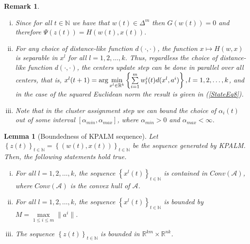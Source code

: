 \documentclass[11pt]{article}
\numberwithin{equation}{section}
\newtheorem{lemma}{Lemma}[proposition]
\newtheorem{remark}{Remark}
\begin{document}
\begin{remark} 
	\begin{enumerate}[(i)] \label{StateEq15}
		\item Since for all $t \in \mathbb{N}$ we have that $w(t) \in \Delta^m$ then $G(w(t))=0$ and therefore $\Psi(z(t)) = H(w(t),x(t))$. \label{StateEq16}
		\item For any choice of distance-like function $d(\cdot, \cdot)$, the function $x \mapsto H(w,x)$ is separable in $x^l$ for all $l = 1, 2, \ldots, k$. Thus, regardless the choice of distance-like function $d(\cdot, \cdot)$, the centers update step can be done in parallel over all centers, that is, $x^l(t+1) = \arg\min\limits_{x^l \in \mathbb{R}^k} \left\lbrace \sum\limits_{i=1}^{m} w^i_l(t) d(x^l , a^i) \right\rbrace, \\ l = 1, 2, \ldots, k$, and in the case of the squared Euclidean norm the result is given in (\ref{StateEq8}).
		\item Note that in the cluster assignment step we can bound the choice of $\alpha_i(t)$  out of some interval $\left[ \alpha_{min} , \alpha_{max} \right]$, where $\alpha_{min} > 0$ and $\alpha_{max} < \infty$. \label{StateItem3}
	\end{enumerate}
\end{remark}

\begin{lemma}[Boundedness of KPALM sequence]
Let $\left\lbrace z(t) \right\rbrace_{t \in \mathbb{N}} = \left\lbrace (w(t) , x(t)) \right\rbrace_{t \in \mathbb{N}}$ be the sequence generated by KPALM. Then, the following statements hold true.
\begin{enumerate}[(i)]
	\item For all $l=1, 2, \ldots ,k$, the sequence $\left\lbrace x^l(t) \right\rbrace_{t \in \mathbb{N}}$ is contained in $Conv(\mathcal{A})$, where $Conv(\mathcal{A})$ is the convex hull of $\mathcal{A}$.
	\item For all $l=1, 2, \ldots ,k$, the sequence $\left\lbrace x^l(t) \right\rbrace_{t \in \mathbb{N}}$ is bounded by $M = \max\limits_{1 \leq i \leq m} \| a^i \|$.
	\item The sequence $\left\lbrace z(t) \right\rbrace_{t \in \mathbb{N}}$ is bounded in $\mathbb{R}^{km} \times \mathbb{R}^{nk}$.
\end{enumerate}
\end{lemma}
\end{document}
